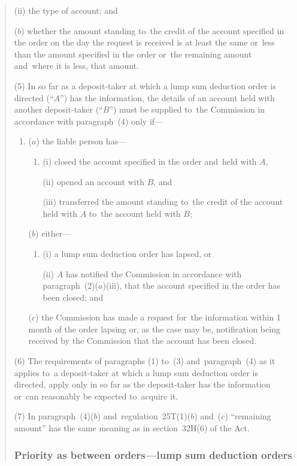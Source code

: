 \documentclass[12pt,a4paper]{article}
\begin{document}
\begin{quotation}
\begin{enumerate}
\begin{enumerate}
(ii) the type of account; and
\end{enumerate}

($b$) whether the amount standing to~the credit of the account specified in the order on the day the request is received is at least the same or~less than the amount specified in the order or~the remaining amount and~where it is less, that amount.
\end{enumerate}

(5) In so far as a deposit-taker at which a lump sum deduction order is directed (“$A$”) has the information, the details of an account held with another deposit-taker (“$B$”) must be supplied to~the Commission in accordance with paragraph~(4) only if—
\begin{enumerate}\item[]
($a$) the liable person has—
\begin{enumerate}\item[]
(i) closed the account specified in the order and~held with $A$,

(ii) opened an account with $B$, and

(iii) transferred the amount standing to~the credit of the account held with $A$ to~the account held with $B$;
\end{enumerate}

($b$) either—
\begin{enumerate}\item[]
(i) a lump sum deduction order has lapsed, or

(ii) $A$ has notified the Commission in accordance with paragraph~(2)($a$)(iii), that the account specified in the order has been closed; and
\end{enumerate}

($c$) the Commission has made a request for~the information within 1 month of the order lapsing or, as the case may be, notification being received by the Commission that the account has been closed.
\end{enumerate}

(6) The requirements of paragraphs (1) to~(3) and~paragraph~(4) as it applies to~a deposit-taker at which a lump sum deduction order is directed, apply only in so far as the deposit-taker has the information or~can reasonably be expected to~acquire it.

(7) In paragraph~(4)($b$)  and~regulation~25T(1)($b$)  and~($c$)  “remaining amount” has the same meaning as in section~32H(6) of the Act.

\subsubsection*{Priority as between orders---lump sum deduction orders}


\end{quotation}
\end{document}
